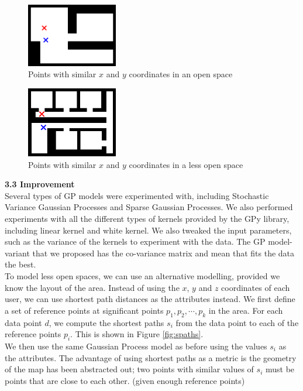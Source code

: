 \documentclass[letterpaper]{article}
\begin{document}
\begin{figure}[h!]
  \centering
    \includegraphics[width=150px,natwidth=634,natheight=442]{openspace1.png}
  \caption{Points with similar $x$ and $y$ coordinates in an open space}
  \label{fig:opspace1}
\end{figure}

\begin{figure}[h!]
  \centering
    \includegraphics[width=150px,natwidth=570,natheight=442]{openspace2.png}
  \caption{Points with similar $x$ and $y$ coordinates in a less open space}
  \label{fig:opspace2}
\end{figure}

{\bf3.3  Improvement} \\

Several types of GP models were experimented with, including Stochastic Variance Gaussian Processes and Sparse Gaussian Processes. We also performed experiments with all the different types of kernels provided by the GPy library, including linear kernel and white kernel. We also tweaked the input parameters, such as the variance of the kernels to experiment with the data. The GP model-variant that we proposed has the co-variance matrix and mean that fits the data the best. \\

To model less open spaces, we can use an alternative modelling, provided we know the layout of the area. Instead of using the $x$, $y$ and $z$ coordinates of each user, we can use shortest path distances as the attributes instead. We first define a set of reference points at significant points $p_1,p_2,\cdots,p_k$ in the area. For each data point $d$, we compute the shortest paths $s_i$ from the data point to each of the reference points $p_i$. This is shown in Figure \ref{fig:spaths}. \\

We then use the same Gaussian Process model as before using the values $s_i$ as the attributes. The advantage of using shortest paths as a metric is the geometry of the map has been abstracted out; two points with similar values of $s_i$ must be points that are close to each other. (given enough reference points)\\
\end{document}
